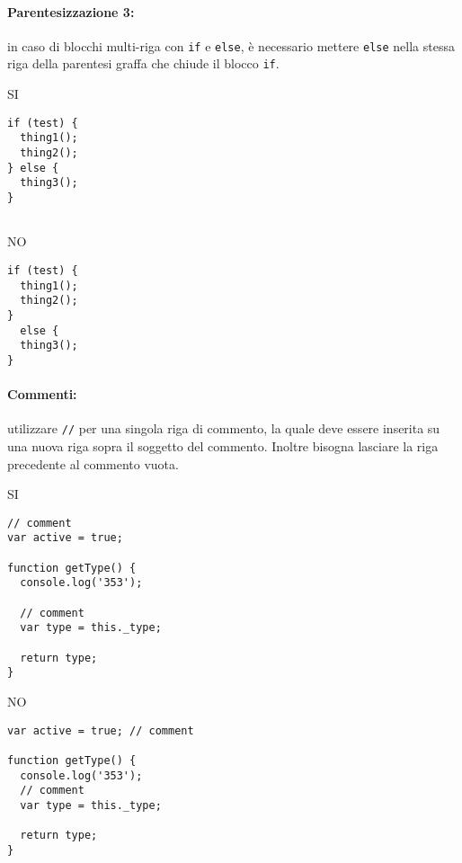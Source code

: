 \documentclass[../ProcessiPrimari.tex]{subfiles}
\begin{document}
\paragraph{Parentesizzazione 3:} in caso di blocchi multi-riga con \texttt{if} e \texttt{else}, è necessario mettere \texttt{else} nella stessa riga della parentesi graffa che chiude il blocco \texttt{if}.

\begin{center}{
\begin{minipage}{6cm}
	{\begin{center}SI\end{center}}
	\begin{Verbatim}[frame=single]
if (test) {
  thing1();
  thing2();
} else {
  thing3();
}
	
	\end{Verbatim}
\end{minipage}
\hfil
\begin{minipage}{6cm}
	{\begin{center}NO\end{center}}
	\begin{Verbatim}[frame=single]
if (test) {
  thing1();
  thing2();
}
  else {
  thing3();
}
	\end{Verbatim}
\end{minipage}
}
\end{center}

\paragraph{Commenti:} utilizzare \texttt{//} per una singola riga di commento, la quale deve essere inserita su una nuova riga sopra il soggetto del commento. Inoltre bisogna lasciare la riga precedente al commento vuota.

\begin{center}{
\begin{minipage}{6cm}
	{\begin{center}SI\end{center}}
	\begin{Verbatim}[frame=single]
// comment
var active = true;

function getType() {
  console.log('353');

  // comment
  var type = this._type;

  return type;
}
	\end{Verbatim}
\end{minipage}
\hfil
\begin{minipage}{6.5cm}
	{\begin{center}NO\end{center}}
	\begin{Verbatim}[frame=single]
var active = true; // comment

function getType() {
  console.log('353');
  // comment
  var type = this._type;

  return type;
}


	\end{Verbatim}
\end{minipage}
}
\end{center}
\end{document}
